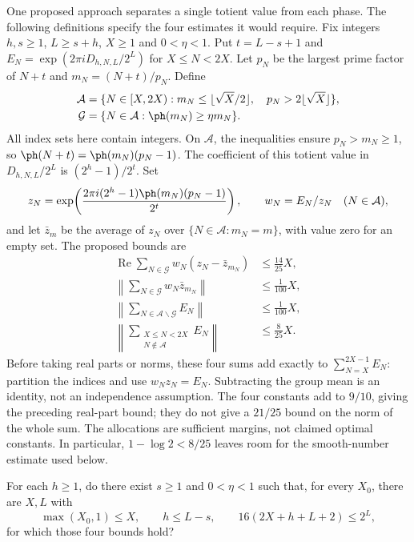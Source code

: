 \documentclass[11pt]{article}
\begin{document}
One proposed approach separates a single totient value from each phase.
The following definitions specify the four estimates it would require.
Fix integers $h,s\ge1$, $L\ge s+h$, $X\ge1$ and $0<\eta<1$. Put
$t=L-s+1$ and $E_N=\exp(2\pi iD_{h,N,L}/2^L)$ for $X\le N<2X$.
Let $p_N$ be the largest prime factor of $N+t$ and $m_N=(N+t)/p_N$.
Define
\[
 \begin{aligned}
 \mathcal A&=\{N\in[X,2X):
       m_N\le\lfloor\sqrt X/2\rfloor,\quad p_N>2\lfloor\sqrt X\rfloor\},\\
 \mathcal G&=\{N\in\mathcal A:\ph(m_N)\ge\eta m_N\}.
 \end{aligned}
\]
All index sets here contain integers. On $\mathcal A$, the inequalities
ensure $p_N>m_N\ge1$, so $\ph(N+t)=\ph(m_N)(p_N-1)$.
The coefficient of this totient value in $D_{h,N,L}/2^L$ is
$(2^h-1)/2^t$. Set
\[
 z_N=\exp\!\left(\frac{2\pi i(2^h-1)\ph(m_N)(p_N-1)}{2^t}\right),
 \qquad w_N=E_N/z_N \quad(N\in\mathcal A),
\]
and let $\bar z_m$ be the average of $z_N$ over
$\{N\in\mathcal A:m_N=m\}$, with value zero for an empty set.
The proposed bounds are
\[
 \begin{aligned}
 \operatorname{Re}\sum_{N\in\mathcal G}w_N(z_N-\bar z_{m_N})
       &\le\tfrac{14}{25}X,\\
 \left\lVert\sum_{N\in\mathcal G}w_N\bar z_{m_N}\right\rVert
       &\le\tfrac1{100}X,\\
 \left\lVert\sum_{N\in\mathcal A\smallsetminus\mathcal G}E_N\right\rVert
       &\le\tfrac1{100}X,\\
 \left\lVert\sum_{\substack{X\le N<2X\\N\notin\mathcal A}}E_N\right\rVert
       &\le\tfrac8{25}X.
 \end{aligned}
\]
Before taking real parts or norms, these four sums add exactly to
$\sum_{N=X}^{2X-1}E_N$: partition the indices and use $w_Nz_N=E_N$.
Subtracting the group mean is an identity, not an independence assumption.
The four constants add to $9/10$, giving the preceding real-part bound;
they do not give a $21/25$ bound on the norm of the whole sum. The allocations
are sufficient margins, not claimed optimal constants. In particular,
$1-\log2<8/25$ leaves room for the smooth-number estimate used below.
\begin{problem}
\label{prob:firstharmonic}
For each $h\ge1$, do there exist $s\ge1$ and $0<\eta<1$ such that, for every
$X_0$, there are $X,L$ with
\[
 \max(X_0,1)\le X,\qquad h\le L-s,\qquad
 16(2X+h+L+2)\le2^L,
\]
for which those four bounds hold?
\end{problem}
\end{document}
